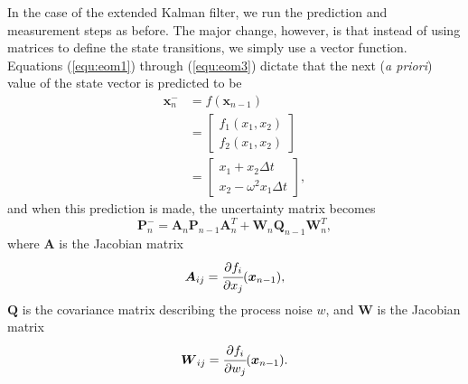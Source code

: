 \documentclass[]{article}
\begin{document}
In the case of the extended Kalman filter, we run the prediction and measurement steps as before. The major change, however, is that instead of using matrices to define the state transitions, we simply use a vector function. Equations (\ref{equ:eom1}) through (\ref{equ:eom3}) dictate that the next (\textit{a priori}) value of the state vector is predicted to be
\begin{equation}
\begin{split}
\boldsymbol{x}_{n}^{-} & = f(\boldsymbol{x}_{n-1}) \\
& = \begin{bmatrix} f_{1}(x_{1}, x_{2}) \\
                    f_{2}(x_{1}, x_{2}) \end{bmatrix} \\
& = \begin{bmatrix} x_{1} + x_{2} \Delta t \\ 
                    x_{2} -\omega^{2} x_{1} \Delta t \end{bmatrix},
\end{split}
\label{equ:state_predict_ekf}
\end{equation}
and when this prediction is made, the uncertainty matrix becomes
\begin{equation}
\boldsymbol{P}_{n}^{-} = \boldsymbol{A}_{n} \boldsymbol{P}_{n-1} \boldsymbol{A}_{n}^{T}
                       + \boldsymbol{W}_{n} \boldsymbol{Q}_{n-1} \boldsymbol{W}_{n}^{T},
\label{equ:uncertainty_predict}
\end{equation}
where $\boldsymbol{A}$ is the Jacobian matrix
\[ \boldsymbol{A}_{ij} = \cfrac{\partial f_{i}}{\partial x_{j}}(\boldsymbol{x}_{n-1}), \]
$\boldsymbol{Q}$ is the covariance matrix describing the process noise $w$, and $\boldsymbol{W}$ is the Jacobian matrix 
\[ \boldsymbol{W}_{ij} = \cfrac{\partial f_{i}}{\partial w_{j}}(\boldsymbol{x}_{n-1}). \]
\end{document}

